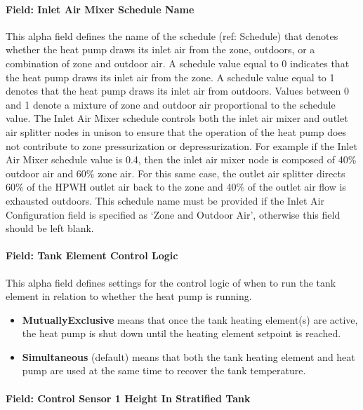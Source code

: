 \paragraph{Field: Inlet Air Mixer Schedule Name}\label{field-inlet-air-mixer-schedule-name-1}

This alpha field defines the name of the schedule (ref: Schedule) that denotes whether the heat pump draws its inlet air from the zone, outdoors, or a combination of zone and outdoor air. A schedule value equal to 0 indicates that the heat pump draws its inlet air from the zone. A schedule value equal to 1 denotes that the heat pump draws its inlet air from outdoors. Values between 0 and 1 denote a mixture of zone and outdoor air proportional to the schedule value. The Inlet Air Mixer schedule controls both the inlet air mixer and outlet air splitter nodes in unison to ensure that the operation of the heat pump does not contribute to zone pressurization or depressurization. For example if the Inlet Air Mixer schedule value is 0.4, then the inlet air mixer node is composed of 40\% outdoor air and 60\% zone air. For this same case, the outlet air splitter directs 60\% of the HPWH outlet air back to the zone and 40\% of the outlet air flow is exhausted outdoors. This schedule name must be provided if the Inlet Air Configuration field is specified as `Zone and Outdoor Air', otherwise this field should be left blank.

\paragraph{Field: Tank Element Control Logic}\label{field-tank-element-control-logic-1}

This alpha field defines settings for the control logic of when to run the tank element in relation to whether the heat pump is running.

\begin{itemize}
\tightlist
\item
  \textbf{MutuallyExclusive} means that once the tank heating element(s) are active, the heat pump is shut down until the heating element setpoint is reached.
\item
  \textbf{Simultaneous} (default) means that both the tank heating element and heat pump are used at the same time to recover the tank temperature.
\end{itemize}

\paragraph{Field: Control Sensor 1 Height In Stratified Tank}\label{field-control-sensor-1-height-in-stratified-tank-1}


